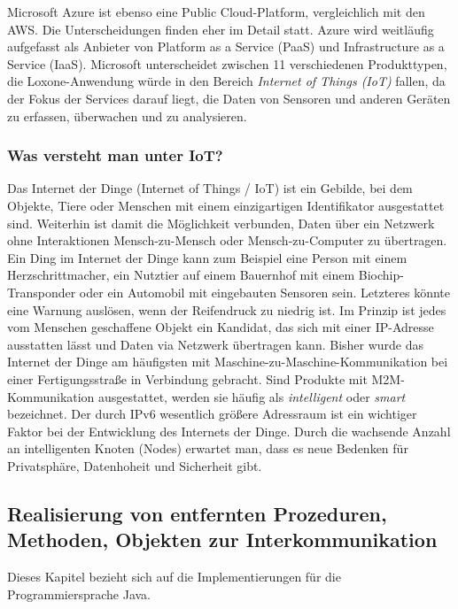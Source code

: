 \documentclass[letterpaper, 12pt]{article}
\let\tempsubsection\subsection
\renewcommand\subsection[1]{\vspace{0cm}\tempsubsection{#1}\vspace{0cm}}
\let\tempsubsubsection\subsubsection
\renewcommand\subsubsection[1]{\vspace{0cm}\tempsubsubsection{#1}\vspace{0cm}}
\begin{document}

Microsoft Azure ist ebenso eine Public Cloud-Platform, vergleichlich mit den AWS. Die Unterscheidungen finden eher im Detail statt. Azure wird weitläufig aufgefasst als Anbieter von Platform as a Service (PaaS) und Infrastructure as a Service (IaaS). Microsoft unterscheidet zwischen 11 verschiedenen Produkttypen, die Loxone-Anwendung würde in den Bereich \textit{Internet of Things (IoT)} fallen, da der Fokus der Services darauf liegt, die Daten von Sensoren und anderen Geräten zu erfassen, überwachen und zu analysieren. \cite{azure}

\subsubsection{Was versteht man unter IoT?}

Das Internet der Dinge (Internet of Things / IoT) ist ein Gebilde, bei dem Objekte, Tiere oder Menschen mit einem einzigartigen Identifikator ausgestattet sind. Weiterhin ist damit die Möglichkeit verbunden, Daten über ein Netzwerk ohne Interaktionen Mensch-zu-Mensch oder Mensch-zu-Computer zu übertragen. Ein Ding im Internet der Dinge kann zum Beispiel eine Person mit einem Herzschrittmacher, ein Nutztier auf einem Bauernhof mit einem Biochip-Transponder oder ein Automobil mit eingebauten Sensoren sein. Letzteres könnte eine Warnung auslösen, wenn der Reifendruck zu niedrig ist. Im Prinzip ist jedes vom Menschen geschaffene Objekt ein Kandidat, das sich mit einer IP-Adresse ausstatten lässt und Daten via Netzwerk übertragen kann. Bisher wurde das Internet der Dinge am häufigsten mit Maschine-zu-Maschine-Kommunikation bei einer Fertigungsstraße in Verbindung gebracht. Sind Produkte mit M2M-Kommunikation ausgestattet, werden sie häufig als \textit{intelligent} oder \textit{smart} bezeichnet. Der durch IPv6 wesentlich größere Adressraum ist ein wichtiger Faktor bei der Entwicklung des Internets der Dinge. Durch die wachsende Anzahl an intelligenten Knoten (Nodes) erwartet man, dass es neue Bedenken für Privatsphäre, Datenhoheit und Sicherheit gibt. \cite{iot} \clearpage

\subsection{Realisierung von entfernten Prozeduren, Methoden, Objekten zur Interkommunikation}

Dieses Kapitel bezieht sich auf die Implementierungen für die Programmiersprache Java.
\end{document}
